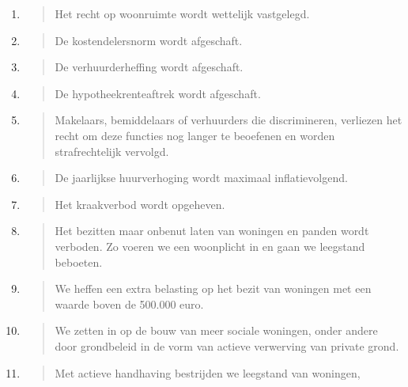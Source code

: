 \begin{enumerate}
\def\labelenumi{\arabic{enumi}.}
\item
  \begin{quote}
  Het recht op woonruimte wordt wettelijk vastgelegd.
  \end{quote}
\item
  \begin{quote}
  De kostendelersnorm wordt afgeschaft.
  \end{quote}
\item
  \begin{quote}
  De verhuurderheffing wordt afgeschaft.
  \end{quote}
\item
  \begin{quote}
  De hypotheekrenteaftrek wordt afgeschaft.
  \end{quote}
\item
  \begin{quote}
  Makelaars, bemiddelaars of verhuurders die discrimineren, verliezen
  het recht om deze functies nog langer te beoefenen en worden
  strafrechtelijk vervolgd.
  \end{quote}
\item
  \begin{quote}
  De jaarlijkse huurverhoging wordt maximaal inflatievolgend.
  \end{quote}
\item
  \begin{quote}
  Het kraakverbod wordt opgeheven.
  \end{quote}
\item
  \begin{quote}
  Het bezitten maar onbenut laten van woningen en panden wordt verboden.
  Zo voeren we een woonplicht in en gaan we leegstand beboeten.
  \end{quote}
\item
  \begin{quote}
  We heffen een extra belasting op het bezit van woningen met een waarde
  boven de 500.000 euro.
  \end{quote}
\item
  \begin{quote}
  We zetten in op de bouw van meer sociale woningen, onder andere door
  grondbeleid in de vorm van actieve verwerving van private grond.
  \end{quote}
\item
  \begin{quote}
  Met actieve handhaving bestrijden we leegstand van woningen,

\end{quote}
\end{enumerate}
